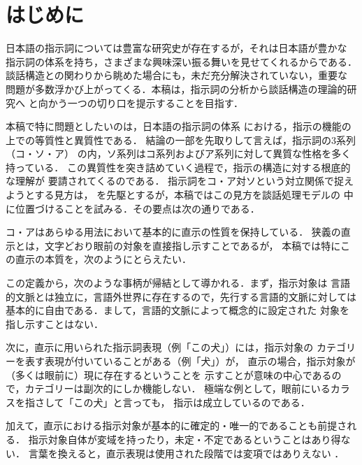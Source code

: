 \vspace{-3mm}
\section{はじめに}
日本語の指示詞については豊富な研究史が存在するが，それは日本語が豊かな
指示詞の体系を持ち，さまざまな興味深い振る舞いを見せてくれるからである．
談話構造との関わりから眺めた場合にも，未だ充分解決されていない，重要な
問題が多数浮かび上がってくる．本稿は，指示詞の分析から談話構造の理論的研究へ
と向かう一つの切り口を提示することを目指す．

本稿で特に問題としたいのは，日本語の指示詞の体系
における，指示の機能の上での等質性と異質性である．
結論の一部を先取りして言えば，指示詞の3系列（コ・ソ・ア）
の内，ソ系列はコ系列およびア系列に対して異質な性格を多く持っている．
この異質性を突き詰めていく過程で，指示の構造に対する根底的な理解が
要請されてくるのである．
指示詞をコ・ア対ソという対立関係で捉えようとする見方は，
を先駆とするが，本稿ではこの見方を談話処理モデルの
中に位置づけることを試みる．その要点は次の通りである．

コ・アはあらゆる用法において基本的に直示の性質を保持している．
狭義の直示とは，文字どおり眼前の対象を直接指し示すことであるが，
本稿では特にこの直示の本質を，次のようにとらえたい\cite{takukin97}．


この定義から，次のような事柄が帰結として導かれる．まず，指示対象は
言語的文脈とは独立に，言語外世界に存在するので，先行する言語的文脈に対しては
基本的に自由である．まして，言語的文脈によって概念的に設定された
対象を指し示すことはない．

次に，直示に用いられた指示詞表現（例「この犬」）には，指示対象の
カテゴリーを表す表現が付いていることがある（例「犬」）が，
直示の場合，指示対象が（多くは眼前に）現に存在するということを
示すことが意味の中心であるので，カテゴリーは副次的にしか機能しない．
極端な例として，眼前にいるカラスを指さして「この犬」と言っても，
指示は成立しているのである．

加えて，直示における指示対象が基本的に確定的・唯一的であることも前提される．
指示対象自体が変域を持ったり，未定・不定であるということはあり得ない．
言葉を換えると，直示表現は使用された段階では変項ではありえない
．

